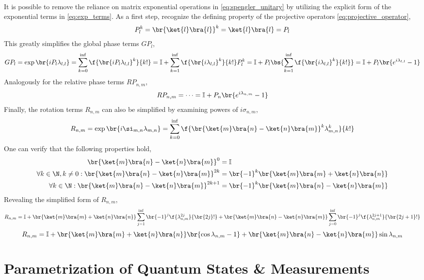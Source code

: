 \documentclass[aps, english, twoside, pra, longbibliography]{revtex4-1}
\begin{document}
    It is possible to remove the reliance on matrix exponential operations in \eqref{eq:spengler_unitary} by utilizing the explicit form of the exponential terms in \eqref{eq:exp_terms}. As a first step, recognize the defining property of the projective operators \eqref{eq:projective_operator},
    \[ P_l^k = \br{\ket{l}\bra{l}}^k = \ket{l}\bra{l} = P_l \]
    This greatly simplifies the global phase terms $GP_l$,
    \[ GP_l = \exp\br{iP_l \lambda_{l,l}} = \sum_{k=0}^{\inf} \f{\br{iP_l \lambda_{l,l}}^k}{k!} = \mathbb{I} + \sum_{k=1}^{\inf} \f{\br{i \lambda_{l,l}}^k}{k!}P_l^k = \mathbb{I} + P_l \bs{\sum_{k=1}^{\inf} \f{\br{i \lambda_{l,l}}^k}{k!}} = \mathbb{I} + P_l \br{e^{i \lambda_{l,l}} - 1} \]
    Analogously for the relative phase terms $RP_{n,m}$,
    \[ RP_{n,m} = \cdots = \mathbb{I} + P_n \br{e^{i \lambda_{n,m}} - 1} \]
    Finally, the rotation terms $R_{n,m}$ can also be simplified by examining powers of $i \sigma_{n,m}$,
    \[ R_{n,m} = \exp\br{i \si_{m,n} \lambda_{m,n}} = \sum_{k=0}^{\inf} \f{\br{\ket{m}\bra{n} - \ket{n}\bra{m}}^k \lambda_{m,n}^k}{k!} \]
    One can verify that the following properties hold,
    \begin{align*}
        \br{\ket{m}\bra{n} - \ket{n}\bra{m}}^0 &= \mathbb{I} \\
        \forall k \in \N, k \neq 0 : \br{\ket{m}\bra{n} - \ket{n}\bra{m}}^{2k} &= \br{-1}^k\br{\ket{m}\bra{m} + \ket{n}\bra{n}} \\
        \forall k \in \N : \br{\ket{m}\bra{n} - \ket{n}\bra{m}}^{2k+1} &= \br{-1}^k\br{\ket{m}\bra{n} - \ket{n}\bra{m}}
    \end{align*}
    Revealing the simplified form of $R_{n,m}$,
    \[ R_{n,m} = \mathbb{I} + \br{\ket{m}\bra{m} + \ket{n}\bra{n}} \sum_{j=1}^{\inf} \br{-1}^j\f{\lambda_{n,m}^{2j}}{\br{2j}!} + \br{\ket{m}\bra{n} - \ket{n}\bra{m}} \sum_{j=0}^{\inf} \br{-1}^j\f{\lambda_{n,m}^{2j+1}}{\br{2j+1}!} \]
    \[ R_{n,m} = \mathbb{I} + \br{\ket{m}\bra{m} + \ket{n}\bra{n}} \br{\cos\lambda_{n,m} - 1} + \br{\ket{m}\bra{n} - \ket{n}\bra{m}} \sin\lambda_{n,m} \]


    \section{Parametrization of Quantum States \& Measurements}

    \nocite{apsrev41Control}
    
\end{document}
